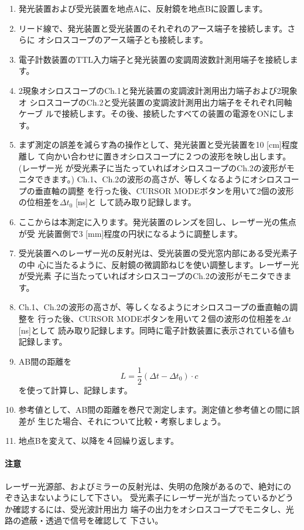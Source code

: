 \begin{enumerate}

\item 発光装置および受光装置を地点Aに、反射鏡を地点Bに設置します。

\item リード線で、発光装置と受光装置のそれぞれのアース端子を接続します。さらに 
オシロスコープのアース端子とも接続します。

\item 電子計数装置のTTL入力端子と発光装置の変調周波数計測用端子を接続します。

\item 2現象オシロスコープのCh.1と発光装置の変調波計測用出力端子および2現象オ 
シロスコープのCh.2と受光装置の変調波計測用出力端子をそれぞれ同軸ケーブ 
ルで接続します。その後、接続したすべての装置の電源をONにします。

\item  まず測定の誤差を減らす為の操作として、発光装置と受光装置を10 [cm]程度離し 
て向かい合わせに置きオシロスコープに２つの波形を映し出します。(レーザー光 
が受光素子に当たっていればオシロスコープのCh.2の波形がモニタできます。) 
Ch.1、Ch.2の波形の高さが、等しくなるようにオシロスコープの垂直軸の調整 
を行った後、CURSOR MODEボタンを用いて2個の波形の位相差を$\Delta t_0$ [ns]と 
して読み取り記録します。

\item ここからは本測定に入ります。発光装置のレンズを回し、レーザー光の焦点が受 
光装置側で3 [mm]程度の円状になるように調整します。

\item 受光装置へのレーザー光の反射光は、受光装置の受光窓内部にある受光素子の中 
心に当たるように、反射鏡の微調節ねじを使い調整します。レーザー光が受光素 
子に当たっていればオシロスコープのCh.2の波形がモニタできます。

\item Ch.1、Ch.2の波形の高さが、等しくなるようにオシロスコープの垂直軸の調整を
行った後、CURSOR MODEボタンを用いて２個の波形の位相差を$\Delta t$ [ns]として
読み取り記録します。同時に電子計数装置に表示されている値も記録します。

\item AB間の距離を
\[
L=\frac{1}{2}(\Delta t -\Delta t_0)\cdot c
\]
を使って計算し、記録します。

\item 参考値として、AB間の距離を巻尺で測定します。測定値と参考値との間に誤差が 
生じた場合、それについて比較・考察しましょう。

\item 地点Bを変えて、以降を４回繰り返します。

\end{enumerate}

\paragraph{注意}
レーザー光源部、およびミラーの反射光は、失明の危険があるので、絶対にの
ぞき込まないようにして下さい。
受光素子にレーザー光が当たっているかどうか確認するには、受光波計用出力 
端子の出力をオシロスコープでモニタし、光路の遮蔽・透過で信号を確認して 
下さい。


